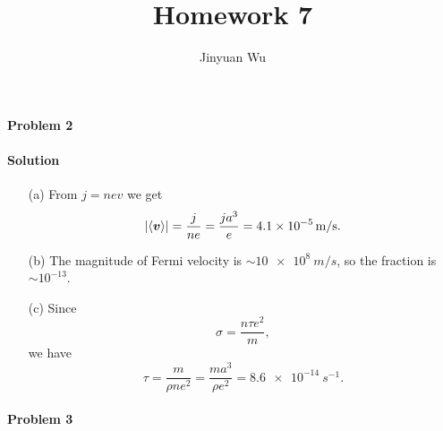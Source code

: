 \documentclass[hyperref, a4paper]{article}
\title{Homework 7}
\author{Jinyuan Wu}
\begin{document}
\maketitle

\paragraph{Problem 2} 

\paragraph{Solution} \begin{itemize}
\item[(a)] From $j = n e v$ we get 
\[
    \abs{\expval{\vb*{v}}} = \frac{j}{n e} = \frac{j a^3}{e} = \SI{4.1e-5}{m/s}.
\]
\item[(b)] The magnitude of Fermi velocity is $\sim \SI{10e8}{m/s}$, 
so the fraction is $\sim 10^{-13}$.
\item[(c)] Since 
\begin{equation}
    \sigma = \frac{n \tau e^2}{m},
\end{equation}
we have 
\[
    \tau = \frac{m}{\rho n e^2} = \frac{m a^3}{\rho e^2} = \SI{8.6e-14}{s^{-1}}.
\]
\end{itemize}

\paragraph{Problem 3}
\end{document}
